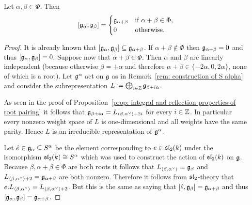 \begin{corollary}
 Let $\alpha, \beta \in \Phi$. Then
 \[
  [\mathfrak{g}_\alpha, \mathfrak{g}_\beta] =
  \begin{cases}
   \mathfrak{g}_{\alpha+\beta} & \text{if $\alpha+\beta \in \Phi$}, \\
   0                 & \text{otherwise}.
  \end{cases}
 \]
\end{corollary}
\begin{proof}
 It is already known that $[\mathfrak{g}_\alpha, \mathfrak{g}_\beta] \subseteq \mathfrak{g}_{\alpha + \beta}$. If $\alpha+\beta \notin \Phi$ then $\mathfrak{g}_{\alpha + \beta} = 0$ and thus $[\mathfrak{g}_\alpha, \mathfrak{g}_\beta] = 0$. Suppose now that $\alpha + \beta \in \Phi$. Then $\alpha$ and $\beta$ are linearly independent (because otherwise $\beta = \pm \alpha$ and therefore $\alpha+\beta \in \{-2\alpha, 0, 2\alpha\}$, none of which is a root). Let $\mathfrak{g}^\alpha$ act on $\mathfrak{g}$ as in Remark~\ref{rem: construction of S alpha} and consider the subrepresentation $L \coloneqq \bigoplus_{i \in \mathbb{Z}} \mathfrak{g}_{\beta + i\alpha}$.
 
 As seen in the proof of Proposition~\ref{prop: integral and reflection properties of root pairing} it follows that $\mathfrak{g}_{\beta + i\alpha} = L_{\langle\beta, \alpha^\vee\rangle+2i}$ for every $i \in \mathbb{Z}$. In particular every nonzero weight space of $L$ is one-dimensional and all weights have the same parity. Hence $L$ is an irreducible representation of $\mathfrak{g}^\alpha$.
 
 Let $\hat{e} \in \mathfrak{g}_\alpha \subseteq S^\alpha$ be the element corresponding to $e \in \mathfrak{sl}_2(k)$ under the isomorphism $\mathfrak{sl}_2(k) \cong S^\alpha$ which was used to construct the action of $\mathfrak{sl}_2(k)$ on $\mathfrak{g}$. Because $\beta, \alpha + \beta \in \Phi$ are both roots it follows that $L_{\langle\beta, \alpha^\vee\rangle} = \mathfrak{g}_\beta$ and $L_{\langle\beta, \alpha^\vee\rangle+2} = \mathfrak{g}_{\alpha+\beta}$ are both nonzero. Therefore it follows from $\mathfrak{sl}_2$-theory that $e.L_{\langle\beta, \alpha^\vee\rangle} = L_{\langle\beta, \alpha^\vee\rangle+2}$. But this is the same as saying that $[\hat{e}, \mathfrak{g}_\beta] = \mathfrak{g}_{\alpha+\beta}$ and thus $[\mathfrak{g}_\alpha, \mathfrak{g}_\beta] = \mathfrak{g}_{\alpha+\beta}$.
\end{proof}



















